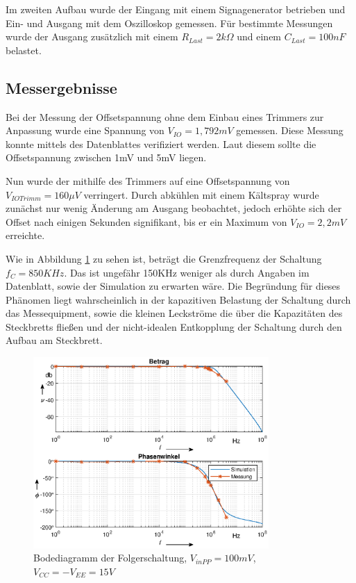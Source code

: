Im zweiten Aufbau wurde der Eingang mit einem Signagenerator betrieben und Ein- und Ausgang mit dem Oszilloskop gemessen. Für bestimmte Messungen wurde der Ausgang zusätzlich mit einem $R_{Last} = 2k\Omega$ und einem $C_{Last} = 100nF$ belastet.


\subsection{Messergebnisse}
Bei der Messung der Offsetspannung ohne dem Einbau eines Trimmers zur Anpassung wurde eine Spannung von $V_{IO} = 1,792 mV$ gemessen. Diese Messung konnte mittels des Datenblattes verifiziert werden. Laut diesem sollte die Offsetspannung zwischen 1mV und 5mV liegen.\cite[6]{ti:ua741}

Nun wurde der mithilfe des Trimmers auf eine Offsetspannung von $V_{IO Trimm} = 160 \mu V$ verringert. Durch abkühlen mit einem Kältspray wurde zunächst nur wenig Änderung am Ausgang beobachtet, jedoch erhöhte sich der Offset nach einigen Sekunden signifikant, bis er ein Maximum von $V_{IO} = 2,2mV$ erreichte. 

Wie in Abbildung \ref{fig:Bode_Folger_ua741} zu sehen ist, beträgt die Grenzfrequenz der Schaltung $f_C=850KHz$. Das ist ungefähr 150KHz weniger als durch Angaben im Datenblatt, sowie der Simulation zu erwarten wäre. Die Begründung für dieses Phänomen liegt wahrscheinlich in der kapazitiven Belastung der Schaltung durch das Messequipment, sowie die kleinen Leckströme die über die Kapazitäten des Steckbretts fließen und der nicht-idealen Entkopplung der Schaltung durch den Aufbau am Steckbrett. 


\begin{figure}[H]
    \centering
    \includegraphics[width=0.8\textwidth]{Lab_1/Plots/Folger.eps}
    \caption{Bodediagramm der Folgerschaltung, $V_{inPP}=100mV$, $V_{CC}=-V_{EE}=15V$}
    \label{fig:Bode_Folger_ua741}
\end{figure}

